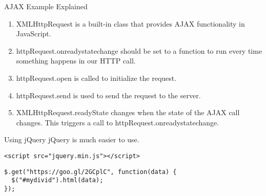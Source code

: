 \begin{frame}{AJAX Example Explained}
  \begin{enumerate}
    \item XMLHttpRequest is a built-in class that provides AJAX functionality in JavaScript.
    \item httpRequest.onreadystatechange should be set to a function to run every time something happens in our HTTP call.
    \item httpRequest.open is called to initialize the request.
    \item httpRequest.send is used to send the request to the server.
    \item XMLHttpRequest.readyState changes when the state of the AJAX call changes. This triggers a call to httpRequest.onreadystatechange.
  \end{enumerate}
\end{frame}


\begin{frame}[fragile]{Using jQuery}
jQuery is much easier to use.
\hr
  \begin{verbatim}
<script src="jquery.min.js"></script>
  \end{verbatim}
  \begin{verbatim}
$.get("https://goo.gl/2GCplC", function(data) {
  $("#mydivid").html(data);
});
  \end{verbatim}
\end{frame}